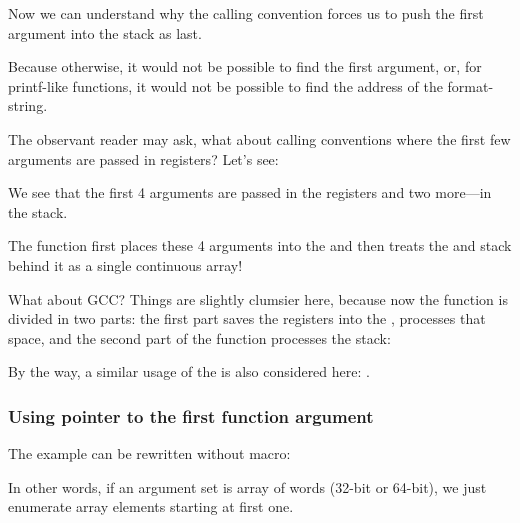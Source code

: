 Now we can understand why the  calling convention forces us to push the first argument 
into the stack as last.

Because otherwise, it would not be possible to find the first argument, 
or, for printf-like functions, it would not be possible to find the address of the format-string.

\label{variadic_arith_registers}

The observant reader may ask, what about calling conventions where the first few arguments are passed in registers?
Let's see:



We see that the first 4 arguments are passed in the registers and two more---in the stack.

The  function first places these 4 arguments into the  and then treats
the  and stack behind it as a single continuous array!

What about GCC? Things are slightly clumsier here, because now the function is divided in two parts:
the first part saves the registers into the , processes that space, and the second part of the function processes 
the stack:



By the way, a similar usage of the  is also considered here: .

\subsubsection{Using pointer to the first function argument}

The example can be rewritten without  macro:



In other words, if an argument set is array of words (32-bit or 64-bit), we just enumerate array elements starting
at first one.

